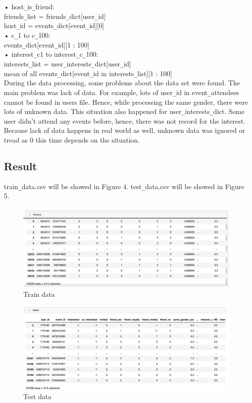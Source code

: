 \documentclass{article}
\begin{document}
•	host\verb+_+is\verb+_+friend: \\
	friends\verb+_+list = friends\verb+_+dict[user\verb+_+id]\\
	host\verb+_+id = events\verb+_+dict[event\verb+_+id][0]\\
•	c\verb+_+1 to c\verb+_+100:\\
	events\verb+_+dict[event\verb+_+id][1 : 100]\\
•	interest\verb+_+c1 to interest\verb+_+c\verb+_+100:\\
	interests\verb+_+list = user\verb+_+interests\verb+_+dict[user\verb+_+id]\\
	mean of all events\verb+_+dict[event\verb+_+id in interests\verb+_+list][1 : 100]\\
	
During the data processing, some problems about the data set were found. The main problem was lack of data. For example, lots of user\verb+_+id in event\verb+_+attendees cannot be found in users file. Hence, while processing the same gender, there were lots of unknown data. This situation also happened for user\verb+_+interests\verb+_+dict. Some user didn’t attend any events before, hence, there was not record for the interest. Because lack of data happens in real world as well, unknown data was ignored or tread as 0 this time depends on the situation.

\subsection{Result}

train\verb+_+data.csv will be showed in Figure 4. test\verb+_+data.csv will be showed in Figure 5.

\begin{figure}[H]
  \centering
  \includegraphics[width=1.0\textwidth]{img/Picture 3}
  \caption{Train data}
\end{figure}

\begin{figure}[H]
  \centering
  \includegraphics[width=1.0\textwidth]{img/Picture 4}
  \caption{Test data}
\end{figure}
\end{document}

